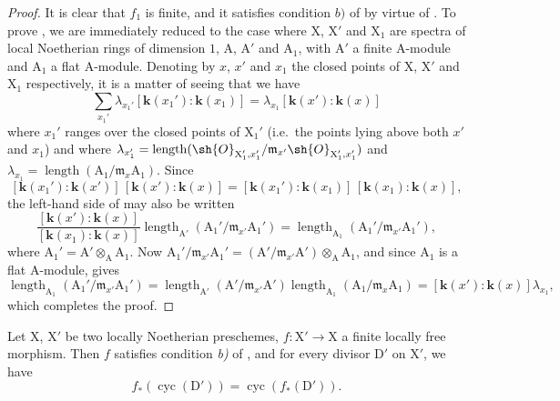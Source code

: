 \begin{proof}
It is clear that $f_1$ is finite, and it satisfies condition $b)$ of  by virtue of .
To prove , we are immediately reduced to the case where $\mathrm{X}$, $\mathrm{X}'$ and $\mathrm{X}_1$ are spectra of local Noetherian rings of dimension $1$, $\mathrm{A}$, $\mathrm{A}'$ and $\mathrm{A}_1$, with $\mathrm{A}'$ a finite A-module and $\mathrm{A}_1$ a flat A-module.
Denoting by $x$, $x'$ and $x_1$ the closed points of $\mathrm{X}$, $\mathrm{X}'$ and $\mathrm{X}_1$ respectively, it is a matter of seeing that we have
\[
\label{IV.21.10.16.2}
  \sum_{x_1'}\lambda_{x_1'}[\boldsymbol{k}(x_1'):\boldsymbol{k}(x_1)]=\lambda_{x_1}[\boldsymbol{k}(x'):\boldsymbol{k}(x)]
  \tag{21.10.16.2}
\]
where $x_1'$ ranges over the closed points of $\mathrm{X}_1'$ (i.e.\ the points lying above both $x'$ and $x_1$) and where $\lambda_{x_1'}=\operatorname{length}(\sh{O}_{\mathrm{X}_1',x_1'}/\mathfrak{m}_{x'}\sh{O}_{\mathrm{X}_1',x_1'})$ and $\lambda_{x_1}=\operatorname{length}(\mathrm{A}_1/\mathfrak{m}_x\mathrm{A}_1)$.
Since
\[
  [\boldsymbol{k}(x_1'):\boldsymbol{k}(x')]\,[\boldsymbol{k}(x'):\boldsymbol{k}(x)]
  = [\boldsymbol{k}(x_1'):\boldsymbol{k}(x_1)]\,[\boldsymbol{k}(x_1):\boldsymbol{k}(x)],
\]
the left-hand side of  may also be written
\[
  \frac{[\boldsymbol{k}(x'):\boldsymbol{k}(x)]}{[\boldsymbol{k}(x_1):\boldsymbol{k}(x)]}
  \operatorname{length}_{\mathrm{A}'}(\mathrm{A}_1'/\mathfrak{m}_{x'}\mathrm{A}_1')
  =\operatorname{length}_{\mathrm{A}_1}(\mathrm{A}_1'/\mathfrak{m}_{x'}\mathrm{A}_1'),
\]
where $\mathrm{A}_1'=\mathrm{A}'\otimes_{\mathrm{A}}\mathrm{A}_1$.
Now $\mathrm{A}_1'/\mathfrak{m}_{x'}\mathrm{A}_1'=(\mathrm{A}'/\mathfrak{m}_{x'}\mathrm{A}')\otimes_{\mathrm{A}}\mathrm{A}_1$, and since $\mathrm{A}_1$ is a flat A-module,  gives
\[
  \operatorname{length}_{\mathrm{A}_1}(\mathrm{A}_1'/\mathfrak{m}_{x'}\mathrm{A}_1')
  =\operatorname{length}_{\mathrm{A}'}(\mathrm{A}'/\mathfrak{m}_{x'}\mathrm{A}')
   \operatorname{length}_{\mathrm{A}_1}(\mathrm{A}_1/\mathfrak{m}_x\mathrm{A}_1)
  =[\boldsymbol{k}(x'):\boldsymbol{k}(x)]\lambda_{x_1},
\]
which completes the proof.
\end{proof}

\begin{proposition}[21.10.17]
\label{IV.21.10.17}
Let $\mathrm{X}$, $\mathrm{X}'$ be two locally Noetherian preschemes, $f:\mathrm{X}'\to\mathrm{X}$ a finite locally free morphism.
Then $f$ satisfies condition \emph{b)} of , and for every divisor $\mathrm{D}'$ on $\mathrm{X}'$, we have
\[
\label{IV.21.10.17.1}
  f_*(\operatorname{cyc}(\mathrm{D}'))=\operatorname{cyc}(f_*(\mathrm{D}')).
  \tag{21.10.17.1}
\]
\end{proposition}

